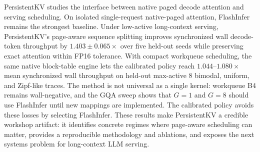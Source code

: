 \documentclass[10pt]{article}
\begin{document}
PersistentKV studies the interface between native paged decode attention and
serving scheduling. On isolated single-request native-paged attention,
FlashInfer remains the strongest baseline. Under low-active long-context
serving, PersistentKV's page-aware sequence splitting improves synchronized
wall decode-token throughput by $1.403{\pm}0.065\times$ over five held-out
seeds while preserving exact attention within FP16 tolerance. With compact
workqueue scheduling, the same native block-table engine lets the calibrated
policy reach $1.044$--$1.080\times$ mean synchronized wall throughput on
held-out max-active 8 bimodal, uniform, and Zipf-like traces. The method is not
universal as a single kernel: workqueue B4 remains wall-negative, and the GQA
sweep shows that $G=1$ and $G=8$ should use FlashInfer until new mappings are
implemented. The calibrated policy avoids these losses by selecting FlashInfer.
These results make PersistentKV a
credible workshop artifact: it identifies concrete regimes where page-aware
scheduling can matter, provides a reproducible methodology and ablations, and
exposes the next systems problem for long-context LLM serving.
\end{document}
